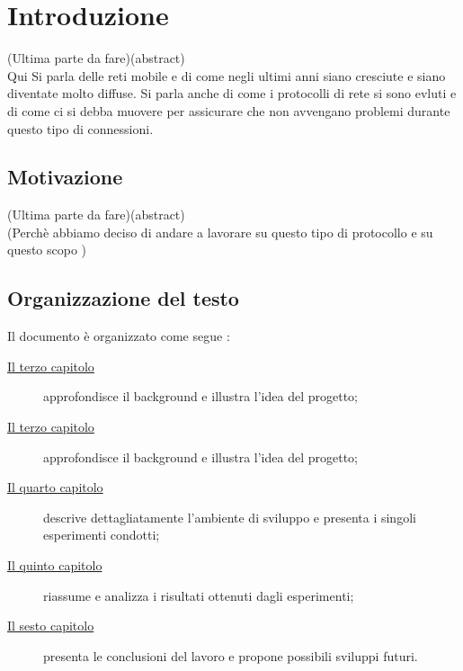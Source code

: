 \chapter{Introduzione}
\label{cap:introduzione}

(Ultima parte da fare)(abstract)\\
Qui Si parla delle reti mobile e di come negli ultimi anni siano cresciute e siano diventate molto diffuse. Si parla anche di come i protocolli di rete si sono evluti e di come ci si debba muovere per assicurare che non avvengano problemi durante questo tipo di connessioni. 


\section{Motivazione}
(Ultima parte da fare)(abstract)\\
(Perchè abbiamo deciso di andare a lavorare su questo tipo di protocollo e su questo scopo )
\section{Organizzazione del testo}

\indent Il documento è organizzato come segue :
\begin{description}
    \item[{\hyperref[cap:descrizione]{Il terzo capitolo}}] approfondisce il background e illustra l'idea del progetto;

    \item[{\hyperref[cap:descrizione]{Il terzo capitolo}}] approfondisce il background e illustra l'idea del progetto;
    
    \item[{\hyperref[cap:processi-metodologie]{Il quarto capitolo}}] descrive dettagliatamente l'ambiente di sviluppo e presenta i singoli esperimenti condotti;

    \item[{\hyperref[cap:risultati]{Il quinto capitolo}}] riassume e analizza i risultati ottenuti dagli esperimenti;
    
    \item[{\hyperref[cap:conclusioni]{Il sesto capitolo}}] presenta le conclusioni del lavoro e propone possibili sviluppi futuri.
\end{description}
